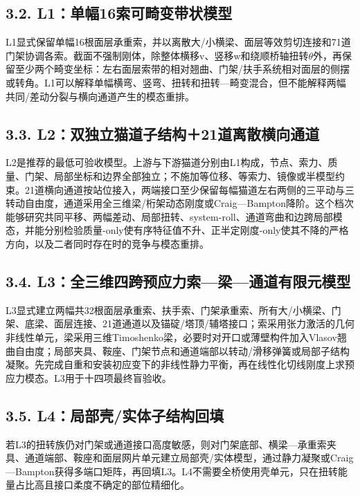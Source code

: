 \documentclass[UTF8,a4paper,11pt,fontset=none]{ctexart}
\begin{document}
\subsection*{3.2. L1：单幅16索可畸变带状模型}
L1显式保留单幅16根面层承重索，并以离散大/小横梁、面层等效剪切连接和71道门架协调各索。截面不强制刚体，除整体横移v、竖移w和绕顺桥轴扭转\(\theta\)\allowbreak{}外，再保留至少两个畸变坐标：左右面层索带的相对翘曲、门架/扶手系统相对面层的侧摆或转角。L1可以解释单幅横弯、竖弯、扭转和扭转—畸变混合，但不能解释两幅共同/差动分裂与横向通道产生的模态重排。\par
{}
\subsection*{3.3. L2：双独立猫道子结构＋21道离散横向通道}
L2是推荐的最低可验收模型。上游与下游猫道分别由L1构成，节点、索力、质量、门架、局部坐标和边界全部独立；不施加等位移、等索力、镜像或半模型约束。21道横向通道按站位接入，两端接口至少保留每幅猫道左右两侧的三平动与三转动自由度，通道采用全三维梁/桁架动态刚度或Craig—Bampton降阶。这个档次能够研究共同平移、两幅差动、局部扭转、system-roll、通道弯曲和边跨局部模态，并能分别检验质量-only使有序特征值不升、正半定刚度-only使其不降的严格方向，以及二者同时存在时的竞争与模态重排。\par
{}
\subsection*{3.4. L3：全三维四跨预应力索—梁—通道有限元模型}
L3显式建立两幅共32根面层承重索、扶手索、门架承重索、所有大/小横梁、门架、底梁、面层连接、21道通道以及锚碇/塔顶/辅塔接口；索采用张力激活的几何非线性单元，梁采用三维Timoshenko梁，必要时对开口或薄壁构件加入Vlasov翘曲自由度；局部夹具、鞍座、门架节点和通道端部以转动/滑移弹簧或局部子结构凝聚。先完成自重和安装初应变下的非线性静力平衡，再在线性化切线刚度上求预应力模态。L3用于十四项最终盲验收。\par
{}
\subsection*{3.5. L4：局部壳/实体子结构回填}
若L3的扭转族仍对门架或通道接口高度敏感，则对门架底部、横梁—承重索夹具、通道端部、鞍座和面层网片单元建立局部壳/实体模型，通过静力凝聚或Craig—Bampton获得多端口矩阵，再回填L3。L4不需要全桥使用壳单元，只在扭转能量占比高且接口柔度不确定的部位精细化。\par
{}
\end{document}
